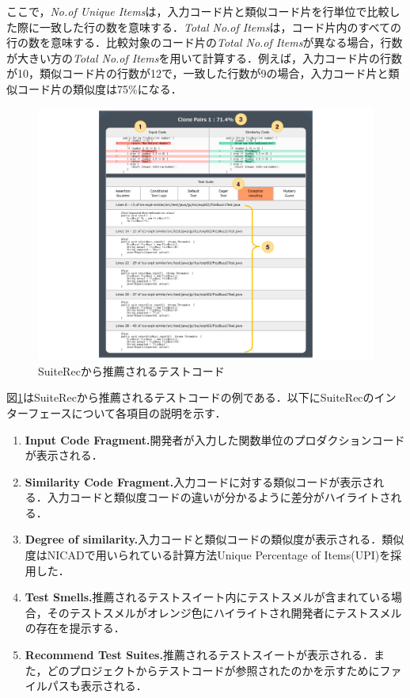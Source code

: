 \documentclass[12pt]{jarticle} %
\begin{document}
ここで，{\it No.of Unique Items}は，入力コード片と類似コード片を行単位で比較した際に一致した行の数を意味する．{\it Total No.of Items}は，コード片内のすべての行の数を意味する．比較対象のコード片の{\it Total No.of Items}が異なる場合，行数が大きい方の{\it Total No.of Items}を用いて計算する．例えば，入力コード片の行数が10，類似コード片の行数が12で，一致した行数が9の場合，入力コード片と類似コード片の類似度は75\%になる．


\begin{figure}[htbp]
  \begin{center}
    \includegraphics[clip,width=15cm]{SuiteRec.pdf}
    \caption{SuiteRecから推薦されるテストコード}
    \label{SR}
  \end{center}
\end{figure}

図\ref{SR}は{\sf SuiteRec}から推薦されるテストコードの例である．以下に{\sf SuiteRec}のインターフェースについて各項目の説明を示す．

\newpage
 \begin{enumerate}
\renewcommand{\labelenumi}{(\arabic{enumi})}
\item{\textbf{Input Code Fragment.}開発者が入力した関数単位のプロダクションコードが表示される．}
\item{\textbf{Similarity Code Fragment.}入力コードに対する類似コードが表示される．入力コードと類似度コードの違いが分かるように差分がハイライトされる．}
\item{\textbf{Degree of similarity.}入力コードと類似コードの類似度が表示される．類似度はNICADで用いられている計算方法Unique Percentage of Items(UPI)を採用した．}
\item{\textbf{Test Smells.}推薦されるテストスイート内にテストスメルが含まれている場合，そのテストスメルがオレンジ色にハイライトされ開発者にテストスメルの存在を提示する．}
\item{\textbf{Recommend Test Suites.}推薦されるテストスイートが表示される．また，どのプロジェクトからテストコードが参照されたのかを示すためにファイルパスも表示される．}
\end{enumerate}
\end{document}
